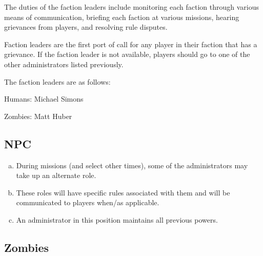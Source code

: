 \documentclass[a4paper,12pt]{article}
\newcommand{\HumanLeader}{Michael Simons}
\newcommand{\ZombieLeader}{Matt Huber}
\begin{document}
The duties of the faction leaders include monitoring each faction through various means of communication, briefing each faction at various missions, hearing grievances from players, and resolving rule disputes.

Faction leaders are the first port of call for any player in their faction that has a grievance. If the faction leader is not available, players should go to one of the other administrators listed previously.

The faction leaders are as follows:

\begin{center}
    \par Humans: \HumanLeader
    \par Zombies: \ZombieLeader
\end{center}


%

\subsection{NPC}

\begin{enumerate}[(a)]
    \item During missions (and select other times), some of the administrators may take up an alternate role.
    \item These roles will have specific rules associated with them and will be communicated to players when/as applicable.
    \item An administrator in this position maintains all previous powers.    
\end{enumerate}

\subsection{Zombies}
\end{document}
